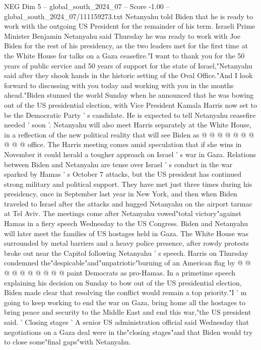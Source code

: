 \begin{textsample}{NEG Dim 5 – global\_south\_2024\_07 – Score -1.00 – global\_south\_2024\_07/111159273.txt}  \label{ex:f5_neg_276}
Netanyahu told Biden that he is ready to work with the outgoing US President for the remainder of his term.
Israeli Prime Minister Benjamin Netanyahu said Thursday he was ready to work with Joe Biden for the rest of his presidency, as the two leaders met for the first time at the White House for talks on a Gaza ceasefire."I want to thank you for the 50 years of public service and 50 years of support for the state of Israel,"Netanyahu said after they shook hands in the historic setting of the Oval Office."And I look forward to discussing with you today and working with you in the months ahead."Biden stunned the world Sunday when he announced that he was bowing out of the US presidential election, with Vice President Kamala Harris now set to be the Democratic Party ' s candidate.
He is expected to tell Netanyahu ceasefire needed ' soon '.
Netanyahu will also meet Harris separately at the White House, in a reflection of the new political reality that will see Biden as @ @ @ @ @ @ @ @ @ @ office.
The Harris meeting comes amid speculation that if she wins in November it could herald a tougher approach on Israel ' s war in Gaza.
Relations between Biden and Netanyahu are tense over Israel ' s conduct in the war sparked by Hamas ' s October 7 attacks, but the US president has continued strong military and political support.
They have met just three times during his presidency, once in September last year in New York, and then when Biden traveled to Israel after the attacks and hugged Netanyahu on the airport tarmac at Tel Aviv.
The meetings come after Netanyahu vowed"total victory"against Hamas in a fiery speech Wednesday to the US Congress.
Biden and Netanyahu will later meet the families of US hostages held in Gaza.
The White House was surrounded by metal barriers and a heavy police presence, after rowdy protests broke out near the Capitol following Netanyahu ' s speech.
Harris on Thursday condemned the"despicable"and"unpatriotic"burning of an American flag by @ @ @ @ @ @ @ @ @ @ paint Democrats as pro-Hamas.
In a primetime speech explaining his decision on Sunday to bow out of the US presidential election, Biden made clear that resolving the conflict would remain a top priority."I ' m going to keep working to end the war on Gaza, bring home all the hostages to bring peace and security to the Middle East and end this war,"the US president said. ' Closing stages ' A senior US administration official said Wednesday that negotiations on a Gaza deal were in the"closing stages"and that Biden would try to close some"final gaps"with Netanyahu.

\end{textsample}
